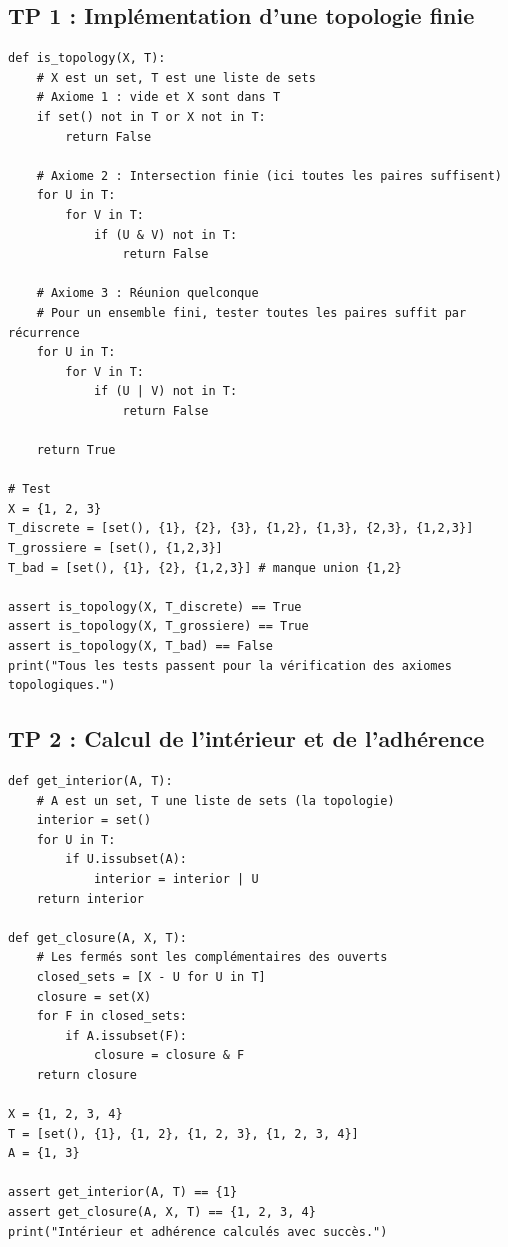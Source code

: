 \documentclass[11pt,a4paper]{article}
\begin{document}
\subsection*{TP 1 : Implémentation d'une topologie finie}
\begin{lstlisting}
def is_topology(X, T):
    # X est un set, T est une liste de sets
    # Axiome 1 : vide et X sont dans T
    if set() not in T or X not in T:
        return False

    # Axiome 2 : Intersection finie (ici toutes les paires suffisent)
    for U in T:
        for V in T:
            if (U & V) not in T:
                return False

    # Axiome 3 : Réunion quelconque
    # Pour un ensemble fini, tester toutes les paires suffit par récurrence
    for U in T:
        for V in T:
            if (U | V) not in T:
                return False

    return True

# Test
X = {1, 2, 3}
T_discrete = [set(), {1}, {2}, {3}, {1,2}, {1,3}, {2,3}, {1,2,3}]
T_grossiere = [set(), {1,2,3}]
T_bad = [set(), {1}, {2}, {1,2,3}] # manque union {1,2}

assert is_topology(X, T_discrete) == True
assert is_topology(X, T_grossiere) == True
assert is_topology(X, T_bad) == False
print("Tous les tests passent pour la vérification des axiomes topologiques.")
\end{lstlisting}

\subsection*{TP 2 : Calcul de l'intérieur et de l'adhérence}
\begin{lstlisting}
def get_interior(A, T):
    # A est un set, T une liste de sets (la topologie)
    interior = set()
    for U in T:
        if U.issubset(A):
            interior = interior | U
    return interior

def get_closure(A, X, T):
    # Les fermés sont les complémentaires des ouverts
    closed_sets = [X - U for U in T]
    closure = set(X)
    for F in closed_sets:
        if A.issubset(F):
            closure = closure & F
    return closure

X = {1, 2, 3, 4}
T = [set(), {1}, {1, 2}, {1, 2, 3}, {1, 2, 3, 4}]
A = {1, 3}

assert get_interior(A, T) == {1}
assert get_closure(A, X, T) == {1, 2, 3, 4}
print("Intérieur et adhérence calculés avec succès.")
\end{lstlisting}
\end{document}

